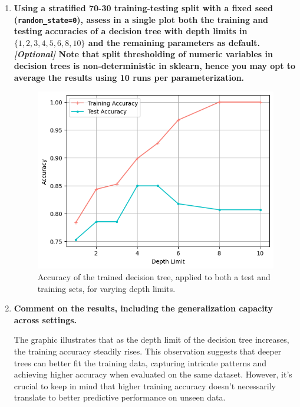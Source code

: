 \documentclass[12pt]{article}
\begin{document}
\begin{enumerate}[leftmargin=\labelsep]
    \item \textbf{Using a stratified 70-30 training-testing split with a fixed seed (\texttt{random\_state=0}), assess in a
          single plot both the training and testing accuracies of a decision tree with depth limits in
          $\{1,2,3,4,5,6,8,10\}$ and the remaining parameters as default.\vskip 0.05cm
          \textit{[Optional]} Note that split thresholding of numeric variables in decision trees is non-deterministic
          in sklearn, hence you may opt to average the results using 10 runs per parameterization.}

          \vskip 0.3cm
          

          \vskip -0.7cm
          \begin{figure}[H]
              \centering
              \includegraphics[width=14cm]{./assets/training_testing_accuracies.png}
              \caption{Accuracy of the trained decision tree, applied to both a test and training sets, for varying depth limits.}
              \label{fig:PartII-ex2-plot}
          \end{figure}

    \item \textbf{Comment on the results, including the generalization capacity across settings.}

          \vskip 0.3cm
          The graphic illustrates that as the depth limit of the decision tree increases, the training accuracy steadily rises.
          This observation suggests that deeper trees can better fit the training data, capturing intricate patterns and achieving higher accuracy when evaluated
          on the same dataset. However, it's crucial to keep in mind that higher training accuracy doesn't necessarily translate to better predictive
          performance on unseen data.


\end{enumerate}
\end{document}

